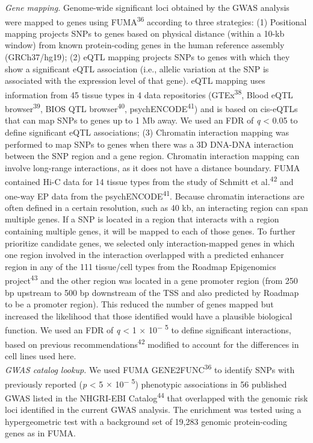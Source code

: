 \begin{refsection}
\noindent
\textit{Gene mapping.} Genome-wide significant loci obtained by the GWAS analysis were mapped to genes using FUMA\textsuperscript{36} according to three strategies: (1) Positional mapping projects SNPs to genes based on physical distance (within a 10-kb window) from known protein-coding genes in the human reference assembly (GRCh37/hg19); (2) eQTL mapping projects SNPs to genes with which they show a significant eQTL association (i.e., allelic variation at the SNP is associated with the expression level of that gene). eQTL mapping uses information from 45 tissue types in 4 data repositories (GTEx\textsuperscript{38}, Blood eQTL browser\textsuperscript{39}, BIOS QTL browser\textsuperscript{40}, psychENCODE\textsuperscript{41}) and is based on cis-eQTLs that can map SNPs to genes up to 1 Mb away. We used an FDR of \textit{q} < 0.05 to define significant eQTL associations; (3) Chromatin interaction mapping was performed to map SNPs to genes when there was a 3D DNA-DNA interaction between the SNP region and a gene region. Chromatin interaction mapping can involve long-range interactions, as it does not have a distance boundary. FUMA contained Hi-C data for 14 tissue types from the study of Schmitt et al.\textsuperscript{42} and one-way EP data from the psychENCODE\textsuperscript{41}. Because chromatin interactions are often defined in a certain resolution, such as 40 kb, an interacting region can span multiple genes. If a SNP is located in a region that interacts with a region containing multiple genes, it will be mapped to each of those genes. To further prioritize candidate genes, we selected only interaction-mapped genes in which one region involved in the interaction overlapped with a predicted enhancer region in any of the 111 tissue/cell types from the Roadmap Epigenomics project\textsuperscript{43} and the other region was located in a gene promoter region (from 250 bp upstream to 500 bp downstream of the TSS and also predicted by Roadmap to be a promoter region). This reduced the number of genes mapped but increased the likelihood that those identified would have a plausible biological function. We used an FDR of \textit{q} < 1 $ \times $  10\textsuperscript{$-$ 5} to define significant interactions, based on previous recommendations\textsuperscript{42} modified to account for the differences in cell lines used here.\\

\noindent
\textit{GWAS catalog lookup.} We used FUMA GENE2FUNC\textsuperscript{36} to identify SNPs with previously reported (\textit{p} < 5 $ \times $  10\textsuperscript{$-$ 5}) phenotypic associations in 56 published GWAS listed in the NHGRI-EBI Catalog\textsuperscript{44} that overlapped with the genomic risk loci identified in the current GWAS analysis. The enrichment was tested using a hypergeometric test with a background set of 19,283 genomic protein-coding genes as in FUMA. \\


\end{refsection}
